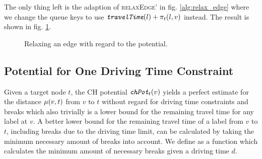 The only thing left is the adaption of \textsc{relaxEdge'} in fig. \ref{alg:relax_edge} where we change the queue keys to use $\texttt{\itshape travelTime}(l) + \pi_t(l,v)$ instead. The result is shown in fig. \ref{alg:relax_edge_a_star}.

\begin{figure}[hbtp]
	\setlength{\interspacetitleruled}{0pt}%
	\setlength{\algotitleheightrule}{0pt}%
	\begin{algorithm*}[H]
		\DontPrintSemicolon



	\end{algorithm*}
	\setlength{\interspacetitleruled}{2pt}%
	\setlength{\algotitleheightrule}{\algotitleheightruledefault}%

	\caption{\label{alg:relax_edge_a_star} Relaxing an edge with regard to the potential.}
\end{figure}

\subsection{Potential for One Driving Time Constraint}\label{section:potential_csp}
Given a target node $t$, the CH potential $\texttt{\itshape chPot}_t(v)$ yields a perfect estimate for the distance $\mu(v,t)$ from $v$ to $t$ without regard for driving time constraints and breaks which also trivially is a lower bound for the remaining travel time for any label at $v$. A better lower bound for the remaining travel time of a label from $v$ to $t$, including breaks due to the driving time limit, can be calculated by taking the minimum necessary amount of breaks into account. We define \minBreaks as a function which calculates the minimum amount of necessary breaks given a driving time $d$.

